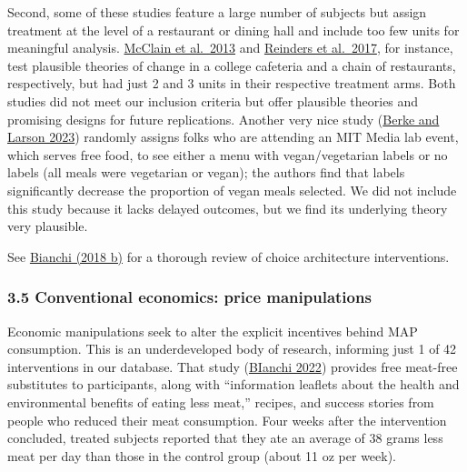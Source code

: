 \documentclass[
  letterpaper,
  DIV=11,
  numbers=noendperiod]{scrartcl}
\begin{document}
Second, some of these studies feature a large number of subjects but
assign treatment at the level of a restaurant or dining hall and include
too few units for meaningful analysis.
\href{https://www.tandfonline.com/doi/abs/10.1080/07448481.2012.755189}{McClain
et al.~2013} and
\href{https://ijbnpa.biomedcentral.com/articles/10.1186/s12966-017-0496-9}{Reinders
et al.~2017}, for instance, test plausible theories of change in a
college cafeteria and a chain of restaurants, respectively, but had just
2 and 3 units in their respective treatment arms. Both studies did not
meet our inclusion criteria but offer plausible theories and promising
designs for future replications. Another very nice study
(\href{https://10.0.3.248/j.appet.2023.106767}{Berke and Larson 2023})
randomly assigns folks who are attending an MIT Media lab event, which
serves free food, to see either a menu with vegan/vegetarian labels or
no labels (all meals were vegetarian or vegan); the authors find that
labels significantly decrease the proportion of vegan meals selected. We
did not include this study because it lacks delayed outcomes, but we
find its underlying theory very plausible.

See \href{https://pubmed.ncbi.nlm.nih.gov/30177007/}{Bianchi (2018 b)}
for a thorough review of choice architecture interventions.

\hypertarget{conventional-economics-price-manipulations}{%
\subsubsection{3.5 Conventional economics: price
manipulations}\label{conventional-economics-price-manipulations}}

Economic manipulations seek to alter the explicit incentives behind MAP
consumption. This is an underdeveloped body of research, informing just
1 of 42 interventions in our database. That study
(\href{https://doi.org/10.1093/ajcn/nqab414}{BIanchi 2022}) provides
free meat-free substitutes to participants, along with ``information
leaflets about the health and environmental benefits of eating less
meat,'' recipes, and success stories from people who reduced their meat
consumption. Four weeks after the intervention concluded, treated
subjects reported that they ate an average of 38 grams less meat per day
than those in the control group (about 11 oz per week).
\end{document}
